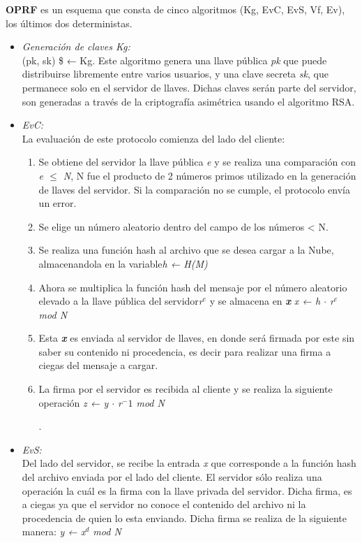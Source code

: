 \textbf{OPRF} es un esquema que consta de cinco algoritmos (Kg, EvC, EvS, Vf, Ev), los últimos dos deterministas. 

\begin{itemize}
	\item \textit{Generación de claves Kg: } \\
	 (pk, sk) \$ ← Kg. Este algoritmo genera una llave pública \textit{pk} que puede distribuirse libremente entre varios usuarios, y una clave secreta \textit{sk}, que permanece solo en el servidor de llaves. Dichas claves serán parte del servidor, son generadas a través de la criptografía asimétrica usando el algoritmo RSA.


	\item \textit{EvC: }\\ 
	La evaluación de este protocolo comienza del lado del cliente: 
	\begin {enumerate}
		\item Se obtiene del servidor la llave pública \textit{e} y se realiza una comparación con  \textit{e $\leq$ N}, N fue el producto de 2 números primos utilizado en la generación de llaves del servidor. Si la comparación no se cumple, el protocolo envía un error.
		\item Se elige un número aleatorio dentro del campo de los números < N. 
		\item Se realiza una función hash al archivo que se desea cargar a la Nube, almacenandola en la variable\textit{h ← H(M)} 
		\item Ahora se multiplica la función hash del mensaje por el número aleatorio elevado a la llave pública del servidor\textit{r$^e$} y se almacena en \textbf{\textit{x}}  \hspace{2cm} \textit{x ← h $\cdot$ r$^e$ mod N}
		\item Esta \textbf{\textit{x}} es enviada al servidor de llaves, en donde será firmada por este sin saber su contenido ni procedencia, es decir para realizar una firma a ciegas del mensaje a cargar. 
		\item La firma por el servidor es recibida al cliente y se realiza la siguiente operación  \hspace{2cm} \textit{z ← y $\cdot$ r$^-1$ mod N}

.
\end{enumerate}
\item \textit{EvS: }\\ 
        Del lado del servidor, se recibe la entrada \textit{x} que corresponde a la función hash del archivo enviada por el lado del cliente. El servidor sólo realiza una operación la cuál es la firma con la llave privada del servidor. Dicha firma, es a ciegas ya que el servidor no conoce el contenido del archivo ni la procedencia de quien lo esta enviando. Dicha firma se realiza de la siguiente manera:    \hspace{2cm} \textit{y ← x$^d$ mod N}






\end{itemize}





